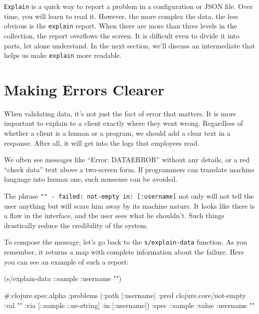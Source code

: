 \verb|Explain| is a quick way to report a problem in a configuration or JSON file. Over time, you will learn to read it. However, the more complex the data, the less obvious is the \verb|explain| report. When there are more than three levels in the collection, the report overflows the screen. It is difficult even to divide it into parts, let alone understand. In the next section, we'll discuss an intermediate that helps us make \verb|explain| more readable.

\section{Making Errors Clearer}


\label{spec-messages}

When validating data, it's not just the fact of error that matters. It is more important to explain to a client exactly where they went wrong. Regardless of whether a client is a human or a program, we should add a clear text in a response. After all, it will get into the logs that employees read.

We often see messages like ``Error: DATAERROR'' without any details, or a red ``check data'' text above a two-screen form. If programmers can translate machine language into human one, such nonsense can be avoided.


The phrase \texttt{"" - failed: not-empty in: [:user\-name]} not only will not tell the user anything but will scare him away by its machine nature. It looks like there is a flaw in the interface, and the user sees what he shouldn't. Such things drastically reduce the credibility of the system.

To compose the message, let's go back to the \verb|s/explain-data| function. As you remember, it returns a map with complete information about the failure. Here you can see an example of such a report:

\begin{english}
  \begin{clojure}
(s/explain-data ::sample {:username ""})

#:clojure.spec.alpha
{:problems
 ({:path [:username]
   :pred clojure.core/not-empty
 :val ""
   :via [::sample ::ne-string]
   :in [:username]})
 :spec ::sample
 :value {:username ""}}
  \end{clojure}
\end{english}

